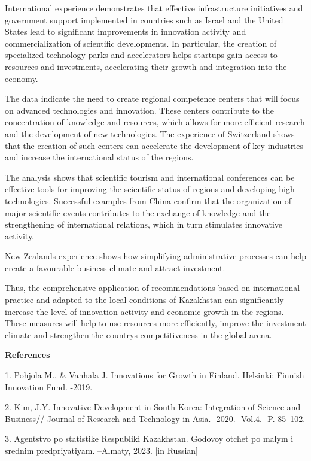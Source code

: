 International experience demonstrates that effective infrastructure
initiatives and government support implemented in countries such as
Israel and the United States lead to significant improvements in
innovation activity and commercialization of scientific developments. In
particular, the creation of specialized technology parks and
accelerators helps startups gain access to resources and investments,
accelerating their growth and integration into the economy.

The data indicate the need to create regional competence centers that
will focus on advanced technologies and innovation. These centers
contribute to the concentration of knowledge and resources, which allows
for more efficient research and the development of new technologies. The
experience of Switzerland shows that the creation of such centers can
accelerate the development of key industries and increase the
international status of the regions.

The analysis shows that scientific tourism and international conferences
can be effective tools for improving the scientific status of regions
and developing high technologies. Successful examples from China confirm
that the organization of major scientific events contributes to the
exchange of knowledge and the strengthening of international relations,
which in turn stimulates innovative activity.

New Zealand\textquotesingle s experience shows how simplifying
administrative processes can help create a favourable business climate
and attract investment.

Thus, the comprehensive application of recommendations based on
international practice and adapted to the local conditions of Kazakhstan
can significantly increase the level of innovation activity and economic
growth in the regions. These measures will help to use resources more
efficiently, improve the investment climate and strengthen the
country\textquotesingle s competitiveness in the global arena.

{\bfseries References}

1. Pohjola M., \& Vanhala J. Innovations for Growth in Finland.
Helsinki: Finnish Innovation Fund. -2019.

2. Kim, J.Y. Innovative Development in South Korea: Integration of
Science and Business// Journal of Research and Technology in Asia.
-2020. -Vol.4. -P. 85--102.

3. Agentstvo po statistike Respubliki Kazakhstan. Godovoy otchet po
malym i srednim predpriyatiyam. --Almaty, 2023. {[}in Russian{]}

